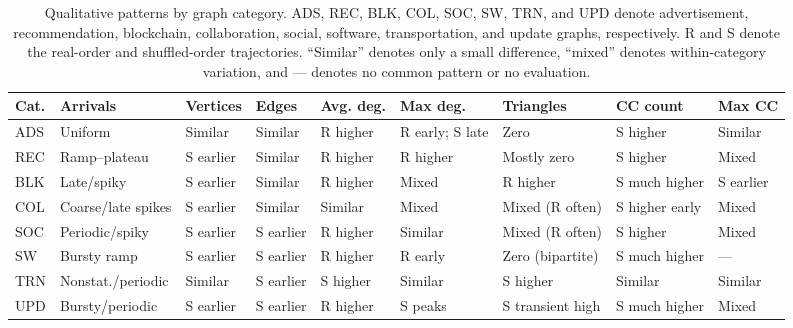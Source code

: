 \documentclass[sigconf,screen,nonacm]{acmart}
\newcommand{\revision}[1]{{\color{RoyalBlue}#1}}
\begin{document}
\onecolumn

\begin{table}[htbp]
  \centering
  \small
  \setlength{\tabcolsep}{2pt}
  \renewcommand{\arraystretch}{1.22}
  \revision{
  \begin{tabular*}{\textwidth}{@{\extracolsep{\fill}}l|llllllll@{}}
    \toprule
    \textbf{Cat.} &
    \textbf{Arrivals} &
    \textbf{Vertices} &
    \textbf{Edges} &
    \textbf{Avg. deg.} &
    \textbf{Max deg.} &
    \textbf{Triangles} &
    \textbf{CC count} &
    \textbf{Max CC} \\
    \midrule
    ADS & Uniform & Similar & Similar & R higher & R early; S late & Zero & S higher & Similar \\
    REC & Ramp--plateau & S earlier & Similar & R higher & R higher & Mostly zero & S higher & Mixed \\
    BLK & Late/spiky & S earlier & Similar & R higher & Mixed & R higher & S much higher & S earlier \\
    COL & Coarse/late spikes & S earlier & Similar & Similar & Mixed & Mixed (R often) & S higher early & Mixed \\
    SOC & Periodic/spiky & S earlier & S earlier & R higher & Similar & Mixed (R often) & S higher & Mixed \\
    SW & Bursty ramp & S earlier & S earlier & R higher & R early & Zero (bipartite) & S much higher & --- \\
    TRN & Nonstat./periodic & Similar & S earlier & S higher & Similar & S higher & Similar & Similar \\
    UPD & Bursty/periodic & S earlier & S earlier & R higher & S peaks & S transient high & S much higher & Mixed \\
    \bottomrule
  \end{tabular*}
  }
  \caption{\revision{Qualitative patterns by graph category. ADS, REC, BLK, COL, SOC, SW, TRN, and UPD denote advertisement, recommendation, blockchain, collaboration, social, software, transportation, and update graphs, respectively. R and S denote the real-order and shuffled-order trajectories. ``Similar'' denotes only a small difference, ``mixed'' denotes within-category variation, and --- denotes no common pattern or no evaluation.}}
  \label{tab:true-vs-shuffled-patterns}
\end{table}
\end{document}
